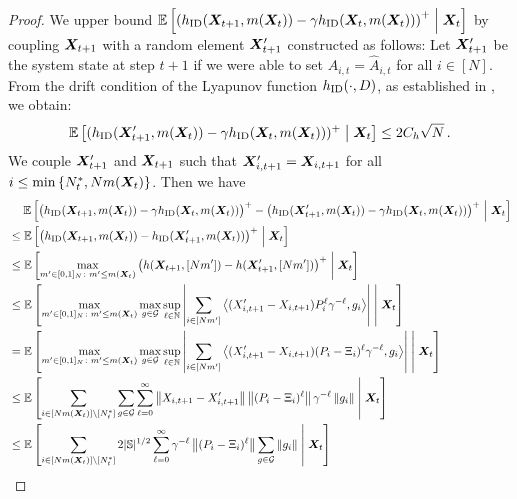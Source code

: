 \begin{proof}
    We upper bound $\mathbb{E}\left[\left(h_{\textnormal{ID}}({\bm{X}}_{t+1},m({\bm{X}}_t))-\gamma h_{\textnormal{ID}}({\bm{X}}_t,m({\bm{X}}_t))\right)^+\;\middle|\;{\bm{X}}_t\right]$ by coupling ${\bm{X}}_{t+1}$ with a random element ${\bm{X}}_{t+1}'$ constructed as follows: Let ${\bm{X}}_{t+1}'$ be the system state at step $t+1$ if we were able to set $A_{i,t}=\widehat{A}_{i,t}$ for all $i\in[N]$. From the drift condition of the Lyapunov function $h_{\textnormal{ID}}(\cdot,D)$, as established in , we obtain: 
    \begin{equation}
        \label{eq:pf-hid-x-mx-shrink:apply-drift-of-hid}
        \mathbb{E}\left[(h_{\textnormal{ID}}({\bm{X}}_{t+1}',m({\bm{X}}_t))-\gamma h_{\textnormal{ID}}({\bm{X}}_t,m({\bm{X}}_t)))^+\;\middle|\;{\bm{X}}_t\right] \leq 2C_h\sqrt{N}\,.
    \end{equation}
    We couple ${\bm{X}}_{t+1}'$ and ${\bm{X}}_{t+1}$ such that ${\bm{X}}_{i,t+1}'={\bm{X}}_{i,t+1}$ for all $i\leq \min\left\{ N_t^*,Nm({\bm{X}}_t) \right\}$. Then we have
    \begin{align}
        \nonumber
        &\mspace{23mu} \EE\mbracket{\big(h_{\ID}(\mX_{t+1},m(\mX_t))-\gamma h_{\ID}(\mX_t,m(\mX_t))\big)^+-\big(h_{\ID}(\mX_{t+1}',m(\mX_t))-\gamma h_{\ID}(\mX_t,m(\mX_t))\big)^+\givenmiddle\mX_t}\\
        \nonumber
        &\leq \EE\mbracket{\big(h_{\ID}(\mX_{t+1},m(\mX_t))-h_{\ID}(\mX_{t+1}',m(\mX_t))\big)^+\givenmiddle\mX_t}\\
        \nonumber
        &\leq \EE\mbracket{\max_{m'\in[0,1]_N\colon m'\leq m(\mX_t)}\big(h(\mX_{t+1},[Nm'])-h(\mX_{t+1}',[Nm'])\big)^+\givenmiddle\mX_t}\\
        \nonumber
        &\leq \EE\mbracket{\max_{m'\in[0,1]_N\colon m'\leq m(\mX_t)} \max_{g\in \mathcal{G}}\supell \abs{\sum_{i\in[Nm']}\innerproduct{(X_{i,t+1}'-X_{i,t+1})P_i^{\ell} \gamma^{-\ell}}{g_i}}\givenmiddle\mX_t}\\
        \nonumber
        &= \EE\mbracket{\max_{m'\in[0,1]_N\colon m'\leq m(\mX_t)}\max_{g\in \mathcal{G}}\supell \abs{\sum_{i\in[Nm']}\innerproduct{(X_{i,t+1}'-X_{i,t+1})(P_i-\Xi_i)^{\ell} \gamma^{-\ell}}{g_i}}\givenmiddle\mX_t}\\
        \nonumber
        &\leq \EE\mbracket{\sum_{i\in[Nm(\mX_t)]\backslash[N_t^*]} \sum_{g\in \mathcal{G}}\sumell \norm{X_{i,t+1}-X_{i,t+1}'}\norm{(P_i-\Xi_i)^{\ell}}\gamma^{-\ell}\norm{g_i}\givenmiddle\mX_t}\\
        \nonumber
        &\leq \EE\mbracket{\sum_{i\in[Nm(\mX_t)]\backslash[N_t^*]} 2\cardS^{1/2} \sumell \gamma^{-\ell}\norm{(P_i-\Xi_i)^{\ell}} \sum_{g\in \mathcal{G}}\norm{g_i} \givenmiddle\mX_t}\\

\end{align}
\end{proof}
